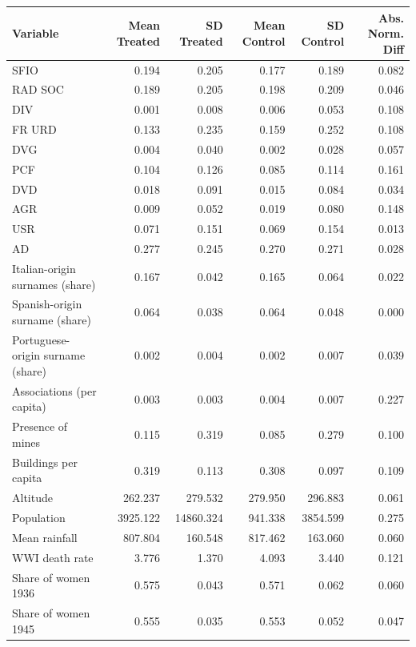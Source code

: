 \begin{tabular}{lrrrrr}
  \toprule
Variable & Mean Treated & SD Treated & Mean Control & SD Control & Abs. Norm. Diff \\ 
  \midrule
SFIO & 0.194 & 0.205 & 0.177 & 0.189 & 0.082 \\ 
  RAD SOC & 0.189 & 0.205 & 0.198 & 0.209 & 0.046 \\ 
  DIV & 0.001 & 0.008 & 0.006 & 0.053 & 0.108 \\ 
  FR URD & 0.133 & 0.235 & 0.159 & 0.252 & 0.108 \\ 
  DVG & 0.004 & 0.040 & 0.002 & 0.028 & 0.057 \\ 
  PCF & 0.104 & 0.126 & 0.085 & 0.114 & 0.161 \\ 
  DVD & 0.018 & 0.091 & 0.015 & 0.084 & 0.034 \\ 
  AGR & 0.009 & 0.052 & 0.019 & 0.080 & 0.148 \\ 
  USR & 0.071 & 0.151 & 0.069 & 0.154 & 0.013 \\ 
  AD & 0.277 & 0.245 & 0.270 & 0.271 & 0.028 \\ 
  Italian-origin surnames (share) & 0.167 & 0.042 & 0.165 & 0.064 & 0.022 \\ 
  Spanish-origin surname (share) & 0.064 & 0.038 & 0.064 & 0.048 & 0.000 \\ 
  Portuguese-origin surname (share) & 0.002 & 0.004 & 0.002 & 0.007 & 0.039 \\ 
  Associations (per capita) & 0.003 & 0.003 & 0.004 & 0.007 & 0.227 \\ 
  Presence of mines & 0.115 & 0.319 & 0.085 & 0.279 & 0.100 \\ 
  Buildings per capita & 0.319 & 0.113 & 0.308 & 0.097 & 0.109 \\ 
  Altitude & 262.237 & 279.532 & 279.950 & 296.883 & 0.061 \\ 
  Population & 3925.122 & 14860.324 & 941.338 & 3854.599 & 0.275 \\ 
  Mean rainfall & 807.804 & 160.548 & 817.462 & 163.060 & 0.060 \\ 
  WWI death rate & 3.776 & 1.370 & 4.093 & 3.440 & 0.121 \\ 
  Share of women 1936 & 0.575 & 0.043 & 0.571 & 0.062 & 0.060 \\ 
  Share of women 1945 & 0.555 & 0.035 & 0.553 & 0.052 & 0.047 \\ 
   \bottomrule
\end{tabular}
